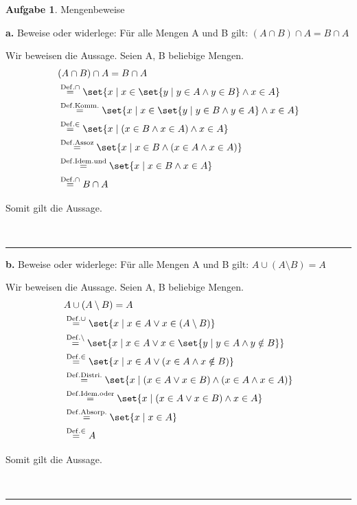\documentclass[10pt,leqno ]{article}
\DeclarePairedDelimiter\set\{\}
\newcommand\customeq[1]{\overset{\mathrm{#1}}{=}}
\theoremstyle{definition}
\newtheorem{problem}[theorem]{Aufgabe}
\newenvironment{solution}[1][L]{\begin{doublespace}\textbf{#1.}\quad }{\ \rule{0.5em}{0.5em}\end{doublespace}}
\begin{document}
\begin{problem}
Mengenbeweise
\end{problem}

\begin{solution}[a]
Beweise oder widerlege: Für alle Mengen A und B gilt: \( (A \cap B) \cap A = B \cap A \)

Wir beweisen die Aussage. Seien A, B beliebige Mengen.
\begin{align*}
    & (A \cap B) \cap A = B \cap A \\
    & \customeq{Def. \cap} \set{x \mid x \in \set{y \mid y \in A \land y \in B} \land x \in A} \\
    & \customeq{Def. Komm.} \set{x \mid x \in \set{y \mid y \in B \land y \in A} \land x \in A} \\
    & \customeq{Def. \in} \set{x \mid (x \in B \land x \in A) \land x \in A} \\
    & \customeq{Def. Assoz} \set{x \mid x \in B \land (x \in A \land x \in A)} \\
    & \customeq{Def. Idem. und} \set{x \mid x \in B \land x \in A} \\
    & \customeq{Def. \cap} B \cap A \\
\end{align*}

Somit gilt die Aussage.

\end{solution}

\begin{solution}[b]
Beweise oder widerlege: Für alle Mengen A und B gilt: \( A \cup (A \setminus B ) = A  \)

Wir beweisen die Aussage. Seien A, B beliebige Mengen.
\begin{align*}
    & A \cup (A \setminus B ) = A \\
    & \customeq{Def. \cup} \set{x \mid x \in A \lor x \in (A \setminus B)} \\
    & \customeq{Def. \setminus} \set{x \mid x \in A \lor x \in \set{y \mid y \in A \land y \notin B}} \\
    & \customeq{Def. \in} \set{x \mid x \in A \lor (x \in A \land x \notin B)} \\
    & \customeq{Def. Distri.} \set{x \mid (x \in A \lor x \in B) \land (x \in A \land x \in A)} \\
    & \customeq{Def. Idem. oder} \set{x \mid (x \in A \lor x \in B) \land x \in A} \\
    & \customeq{Def. Absorp.} \set{x \mid x \in A} \\
    & \customeq{Def. \in} A \\
\end{align*}

Somit gilt die Aussage.

\end{solution}
\end{document}
